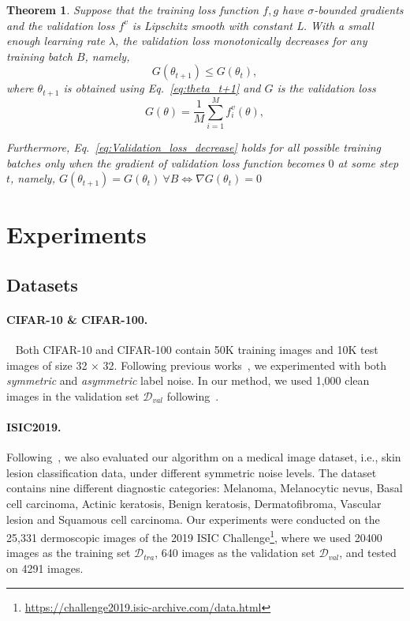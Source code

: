 \documentclass{article}
\newtheorem{theorem}{Theorem}
\begin{document}
\begin{theorem}
\label{theorem:convergence}
Suppose that the training loss function $f,g$ have $\sigma$-bounded gradients and the validation loss $f^v$ is Lipschitz smooth with constant L. With a small enough learning rate $\lambda$, the validation loss monotonically decreases for any training batch $B$, namely, 
\begin{equation}\label{eq:Validation_loss_decrease}
G(\theta_{t+1})\leq G(\theta_t),
\end{equation}
where $\theta_{t+1}$ is obtained using Eq.~\eqref{eq:theta_t+1} and $G$ is the validation loss
\begin{equation}\label{eq:Validation_loss}
G(\theta)=\frac{1}{M}\sum_{i=1}^M f_i^v(\theta),
\end{equation}

Furthermore, Eq.~\eqref{eq:Validation_loss_decrease} holds for all possible training batches only when the gradient of validation loss function becomes $0$ at some step $t$, namely, $G(\theta_{t+1})=G(\theta_t)\ \forall B \Leftrightarrow \nabla G(\theta_t)=0$
\end{theorem}



    



\section{Experiments}
\label{sec:experiments}
\subsection{Datasets}

\paragraph{CIFAR-10 \& CIFAR-100.}~\label{sec:data} Both CIFAR-10 and CIFAR-100 contain 50K training images and 10K test images of size 32 × 32.
Following previous works~\cite{tanaka2018joint,kim2019nlnl,li2020dividemix}, we experimented with both \emph{symmetric} and \emph{asymmetric} label noise.
In our method, we used 1,000 clean images in the validation set $\mathcal{D}_{val}$ following~\cite{jiang2018mentornet,ren2018learning,shu2019meta,hendrycks2018using,zheng2021meta}.

\paragraph{ISIC2019.} Following~\cite{xue2019robust}, we also evaluated our algorithm on a medical image dataset, i.e., skin lesion classification data, under different symmetric noise levels. The dataset contains nine different diagnostic categories: Melanoma, Melanocytic nevus, Basal cell carcinoma, Actinic keratosis, Benign keratosis, Dermatofibroma, Vascular lesion and Squamous cell carcinoma.
Our experiments were conducted on the 25,331 dermoscopic images of the 2019 ISIC Challenge\footnote{\url{https://challenge2019.isic-archive.com/data.html}}, where we used 20400 images as the training set $\mathcal{D}_{tra}$, 640 images as the validation set $\mathcal{D}_{val}$, and tested on 4291 images. 
\end{document}

